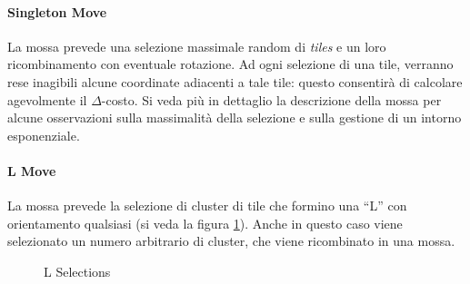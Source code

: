 
    \paragraph{Singleton Move} %
    \label{par:singleton}

        La mossa prevede una selezione massimale random di \emph{tiles} e un loro ricombinamento con eventuale rotazione. Ad ogni selezione di una tile, verranno rese inagibili alcune coordinate adiacenti a tale tile: questo consentirà di calcolare agevolmente il $\Delta$-costo. Si veda più in dettaglio la descrizione della mossa per alcune osservazioni sulla massimalità della selezione e sulla gestione di un intorno esponenziale.

    

    \paragraph{L Move} %
    \label{par:l}

        La mossa prevede la selezione di cluster di tile che formino una ``L'' con orientamento qualsiasi (si veda la figura \ref{fig:Lmove}). Anche in questo caso viene selezionato un numero arbitrario di cluster, che viene ricombinato in una mossa.

        \begin{figure}[H]
            \centering
            \caption{L Selections}
            \label{fig:Lmove}
        \end{figure}
    
